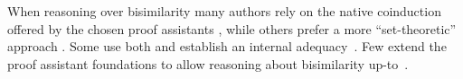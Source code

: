 \documentclass[runningheads]{llncs}
\begin{document}
When reasoning over bisimilarity many authors rely on the native
 coinduction offered by the chosen proof assistants
\cite{Bengtson2016,Kahsai2008,Thiemann2019,Gay2020}, while others prefer a
more ``set-theoretic'' approach
\cite{Hirschkoff1997,Bengtson2009,Maksimovic2015,Pohjola2022}. Some
use both and establish an internal adequacy~\cite{Honsell2001}. Few
extend the proof assistant foundations to allow \eg reasoning about
bisimilarity up-to~\cite{ChaudhuriCM15}.


\end{document}

